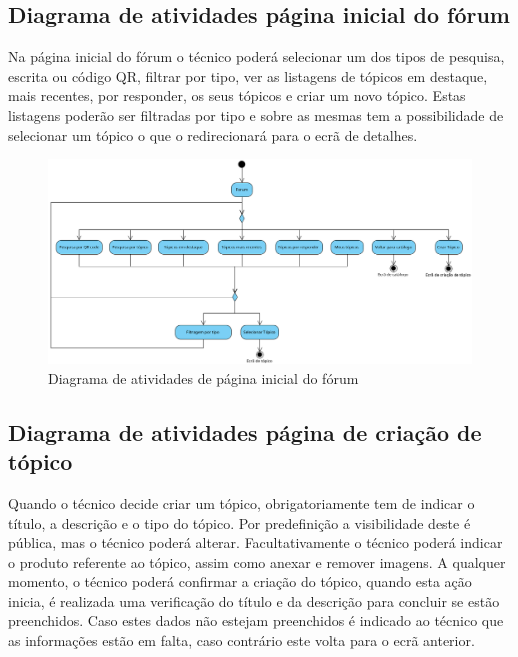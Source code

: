 \newpage

\subsection{Diagrama de atividades página inicial do fórum}

Na página inicial do fórum o técnico poderá selecionar um dos tipos de pesquisa, escrita ou código QR, filtrar por tipo, ver as listagens de tópicos em destaque, mais recentes, por responder, os seus tópicos e criar um novo tópico. Estas listagens poderão ser filtradas por tipo e sobre as mesmas tem a possibilidade de selecionar um tópico o que o redirecionará para o ecrã de detalhes.

\begin{figure}[htb]
  \centering
  \includegraphics[width=\textwidth]{images/diagramas/atividades/diagrama_atividades_forum.png}
  \caption{Diagrama de atividades de página inicial do fórum}
  \label{fig:36}
\end{figure}

\newpage

\subsection{Diagrama de atividades página de criação de tópico}

Quando o técnico decide criar um tópico, obrigatoriamente tem de indicar o título, a descrição e o tipo do tópico. Por predefinição a visibilidade deste é pública, mas o técnico poderá alterar. Facultativamente o técnico poderá indicar o produto referente ao tópico, assim como anexar e remover imagens. A qualquer momento, o técnico poderá confirmar a criação do tópico, quando esta ação inicia, é realizada uma verificação do título e da descrição para concluir se estão preenchidos. Caso estes dados não estejam preenchidos é indicado ao técnico que as informações estão em falta, caso contrário este volta para o ecrã anterior.


